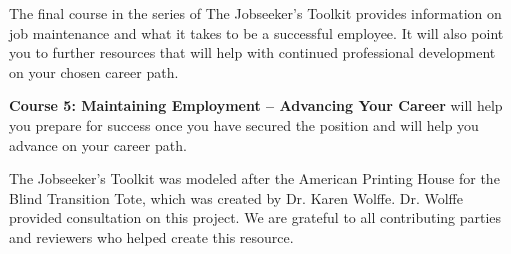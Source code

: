 The final course in the series of The Jobseeker’s Toolkit provides information on job maintenance and what it takes to be a successful employee. It will also point you to further resources that will help with continued professional development on your chosen career path.

\textbf{Course 5: Maintaining Employment – Advancing Your Career} will help you prepare for success once you have secured the position and will help you advance on your career path.

The Jobseeker's Toolkit was modeled after the American Printing House for the Blind Transition Tote, which was created by Dr. Karen Wolffe. Dr. Wolffe provided consultation on this project. We are grateful to all contributing parties and reviewers who helped create this resource.

\clearpage
\mbox{}

